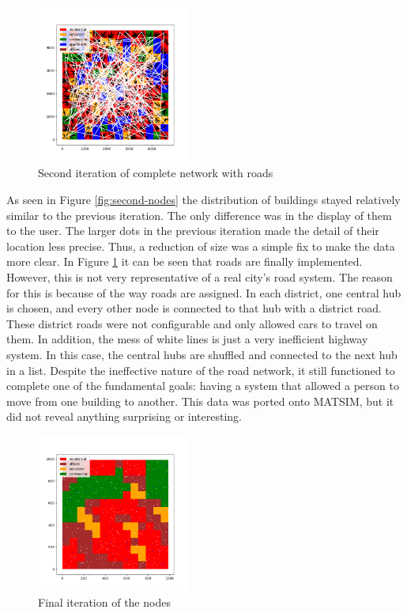 \documentclass[11pt]{article}
\begin{document}
\begin{multicols}{2}
    \begin{figure}[H]
        \centering
        \vspace{-1em}
        \includegraphics[width=0.45\textwidth]{images/secondzoningwnetwork.png}
        \caption{Second iteration of complete network with roads}
        \label{fig:second-network}
    \end{figure}

    \quad As seen in Figure \ref{fig:second-nodes} the distribution of buildings stayed relatively similar to the previous iteration. The only difference was in the display of them to the user. The larger dots in the previous iteration made the detail of their location less precise. Thus, a reduction of size was a simple fix to make the data more clear. In Figure \ref{fig:second-network} it can be seen that roads are finally implemented. However, this is not very representative of a real city's road system. The reason for this is because of the way roads are assigned. In each district, one central hub is chosen, and every other node is connected to that hub with a district road. These district roads were not configurable and only allowed cars to travel on them. In addition, the mess of white lines is just a very inefficient highway system. In this case, the central hubs are shuffled and connected to the next hub in a list. Despite the ineffective nature of the road network, it still functioned to complete one of the fundamental goals: having a system that allowed a person to move from one building to another. This data was ported onto MATSIM\cite{matsim}, but it did not reveal anything surprising or interesting. \\

    \begin{figure}[H]
        \centering
        \includegraphics[width=0.45\textwidth]{images/finalzoningwnodes.png}
        \caption{Final iteration of the nodes}
        \label{fig:final-zoning-nodes}
    \end{figure}


\end{multicols}
\end{document}
